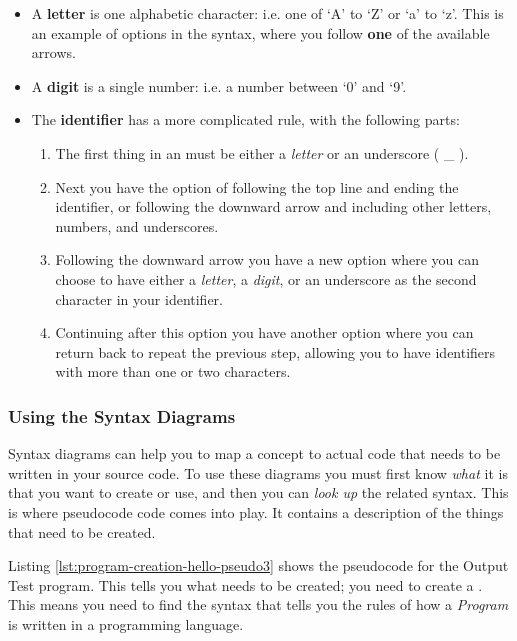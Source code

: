 \begin{itemize}
  \item A \textbf{letter} is one alphabetic character: i.e. one of `A' to `Z' or `a' to `z'. This is an example of options in the syntax, where you follow \textbf{one} of the available arrows.
  \item A \textbf{digit} is a single number: i.e. a number between `0' and `9'.
  
  \item The \textbf{identifier} has a more complicated rule, with the following parts:
  \begin{enumerate}
    \item The first thing in an  must be either a \emph{letter} or an underscore ( \_ ).
    \item Next you have the option of following the top line and ending the identifier, or following the downward arrow and including other letters, numbers, and underscores.
    \item Following the downward arrow you have a new option where you can choose to have either a \emph{letter}, a \emph{digit}, or an underscore as the second character in your identifier.
    \item Continuing after this option you have another option where you can return back to repeat the previous step, allowing you to have identifiers with more than one or two characters.
  \end{enumerate}
\end{itemize}

\subsubsection{Using the Syntax Diagrams} %
\label{ssub:using_the_syntax_diagrams}

Syntax diagrams can help you to map a concept to actual code that needs to be written in your source code. To use these diagrams you must first know \emph{what} it is that you want to create or use, and then you can \emph{look up} the related syntax. This is where pseudocode code comes into play. It contains a description of the things that need to be created. 

Listing \ref{lst:program-creation-hello-pseudo3} shows the pseudocode for the Output Test program. This tells you what needs to be created; you need to create a . This means you need to find the syntax that tells you the rules of how a \emph{Program} is written in a programming language. 

